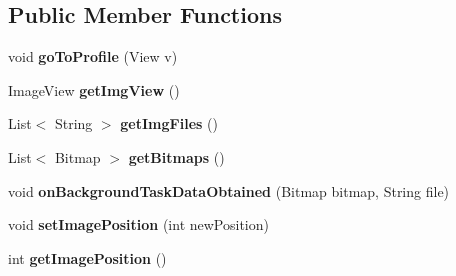\subsection*{Public Member Functions}
\begin{DoxyCompactItemize}
\item 
void {\bfseries go\+To\+Profile} (View v)\hypertarget{classcom_1_1example_1_1sebastian_1_1tindertp_1_1MatchingActivity_a165578fb0308f52996c88c0cc0707006}{}\label{classcom_1_1example_1_1sebastian_1_1tindertp_1_1MatchingActivity_a165578fb0308f52996c88c0cc0707006}

\item 
Image\+View {\bfseries get\+Img\+View} ()\hypertarget{classcom_1_1example_1_1sebastian_1_1tindertp_1_1MatchingActivity_a938baa2ab6824889728cfc617764afff}{}\label{classcom_1_1example_1_1sebastian_1_1tindertp_1_1MatchingActivity_a938baa2ab6824889728cfc617764afff}

\item 
List$<$ String $>$ {\bfseries get\+Img\+Files} ()\hypertarget{classcom_1_1example_1_1sebastian_1_1tindertp_1_1MatchingActivity_a00246ce41d7222a8fa5c7f5657e284d3}{}\label{classcom_1_1example_1_1sebastian_1_1tindertp_1_1MatchingActivity_a00246ce41d7222a8fa5c7f5657e284d3}

\item 
List$<$ Bitmap $>$ {\bfseries get\+Bitmaps} ()\hypertarget{classcom_1_1example_1_1sebastian_1_1tindertp_1_1MatchingActivity_aa2cfbb4cdc6300d9c6fc1240c845fe37}{}\label{classcom_1_1example_1_1sebastian_1_1tindertp_1_1MatchingActivity_aa2cfbb4cdc6300d9c6fc1240c845fe37}

\item 
void {\bfseries on\+Background\+Task\+Data\+Obtained} (Bitmap bitmap, String file)\hypertarget{classcom_1_1example_1_1sebastian_1_1tindertp_1_1MatchingActivity_a634d97470e5ca1eda7bd9584ed2402a0}{}\label{classcom_1_1example_1_1sebastian_1_1tindertp_1_1MatchingActivity_a634d97470e5ca1eda7bd9584ed2402a0}

\item 
void {\bfseries set\+Image\+Position} (int new\+Position)\hypertarget{classcom_1_1example_1_1sebastian_1_1tindertp_1_1MatchingActivity_a2f69aa53bde1d67332a8ccf922bb24df}{}\label{classcom_1_1example_1_1sebastian_1_1tindertp_1_1MatchingActivity_a2f69aa53bde1d67332a8ccf922bb24df}

\item 
int {\bfseries get\+Image\+Position} ()\hypertarget{classcom_1_1example_1_1sebastian_1_1tindertp_1_1MatchingActivity_a669ff374aa150a7771328b031445d8ff}{}\label{classcom_1_1example_1_1sebastian_1_1tindertp_1_1MatchingActivity_a669ff374aa150a7771328b031445d8ff}


\end{DoxyCompactItemize}
